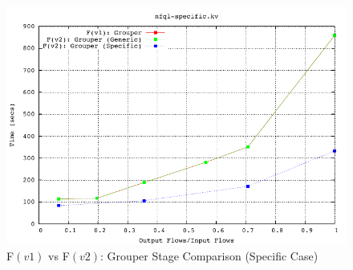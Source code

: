 \begin{figure}[h!]
  \begin{center}
    \includegraphics* [width=0.8\linewidth]{figures/benchmarks/grouper-fv1-fv2}
    \caption{F$(v1)$ vs F$(v2)$: Grouper Stage Comparison (Specific Case)}
    \label{fig:fv1-fv2-grouper}
  \end{center}
\end{figure}

